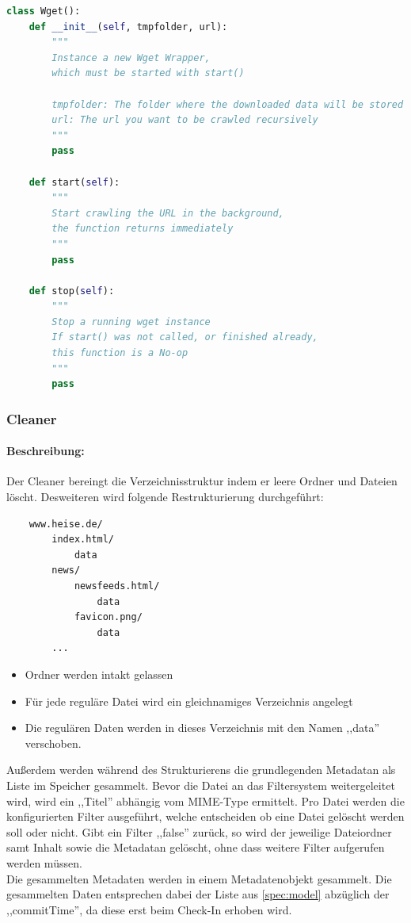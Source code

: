 \begin{lstlisting}[language=python]
class Wget():
    def __init__(self, tmpfolder, url):
        """
        Instance a new Wget Wrapper,
        which must be started with start()

        tmpfolder: The folder where the downloaded data will be stored
        url: The url you want to be crawled recursively
        """
        pass

    def start(self): 
        """
        Start crawling the URL in the background,
        the function returns immediately
        """
        pass

    def stop(self):
        """
        Stop a running wget instance
        If start() was not called, or finished already,
        this function is a No-op
        """
        pass
\end{lstlisting}

\subsubsection{Cleaner}
\label{ssub:cleaner}
\paragraph{Beschreibung:}
\label{par:beschreibung_}
Der Cleaner bereingt die Verzeichnisstruktur indem er leere Ordner und Dateien löscht.
Desweiteren wird folgende Restrukturierung durchgeführt:
\begin{verbatim}
    www.heise.de/ 
        index.html/
            data
        news/
            newsfeeds.html/
                data
            favicon.png/
                data
        ...
\end{verbatim}


\begin{itemize}
    \item Ordner werden intakt gelassen
    \item Für jede reguläre Datei wird ein gleichnamiges Verzeichnis angelegt
    \item Die regulären Daten werden in dieses Verzeichnis mit den Namen ,,data'' verschoben.
\end{itemize}

Außerdem werden während des Strukturierens die grundlegenden Metadatan als Liste im Speicher gesammelt.
Bevor die Datei an das Filtersystem weitergeleitet wird, wird ein ,,Titel'' abhängig vom MIME-Type ermittelt.
Pro Datei werden die konfigurierten Filter ausgeführt, welche entscheiden ob eine Datei gelöscht werden soll oder nicht.
Gibt ein Filter ,,false'' zurück, so wird der jeweilige Dateiordner samt Inhalt sowie die Metadatan gelöscht,
ohne dass weitere Filter aufgerufen werden müssen.
\\
Die gesammelten Metadaten werden in einem Metadatenobjekt gesammelt. Die gesammelten Daten entsprechen dabei 
der Liste aus \ref{spec:model} abzüglich der ,,commitTime'', da diese erst beim Check-In erhoben wird.

